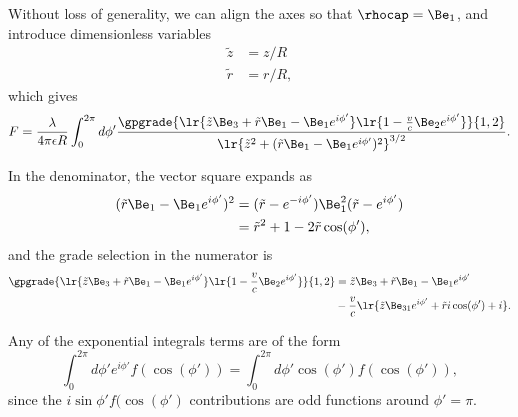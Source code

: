 Without loss of generality, we can align the axes so that \( \rhocap = \Be_1 \), and
introduce dimensionless variables
\begin{equation}\label{eqn:ringField:100}
\begin{aligned}
\tilde{z} &= z/R \\
\tilde{r} &= r/R,
\end{aligned}
\end{equation}
which gives
\begin{equation}\label{eqn:ringField:120}
F
= \frac{\lambda}{4 \pi \epsilon R} \int_0^{2\pi} d\phi' \frac{\gpgrade{ \lr{ \tilde{z} \Be_3 + \tilde{r} \Be_1 - \Be_1 e^{i\phi'} } \lr{ 1 - \frac{v}{c} \Be_2 e^{i\phi'} } }{1,2} } { \lr{ \tilde{z}^2 + (\tilde{r} \Be_1 - \Be_1 e^{i\phi'})^2}^{3/2} }.
\end{equation}

In the denominator, the vector square expands as
\begin{equation}\label{eqn:ringField:140}
\begin{aligned}
(\tilde{r} \Be_1 - \Be_1 e^{i\phi'})^2
&= (\tilde{r} - e^{-i\phi'}) \Be_1^2 (\tilde{r} - e^{i\phi'}) \\
&= \tilde{r}^2 + 1 - 2 \tilde{r} \cos(\phi'),
\end{aligned}
\end{equation}
and the grade selection in the numerator is
\begin{equation}\label{eqn:ringField:160}
\begin{aligned}
\gpgrade{ \lr{ \tilde{z} \Be_3 + \tilde{r} \Be_1 - \Be_1 e^{i\phi'} } \lr{ 1 - \frac{v}{c} \Be_2 e^{i\phi'}}}{1,2}
&=
\tilde{z} \Be_3 + \tilde{r} \Be_1 - \Be_1 e^{i\phi'} \\
&-\frac{v}{c}\lr{ \tilde{z} \Be_{31} e^{i\phi'} + \tilde{r} i \cos(\phi') + i }.
\end{aligned}
\end{equation}

Any of the exponential integrals terms
are of the form
\begin{equation}\label{eqn:ringField:180}
\int_0^{2\pi} d\phi' e^{i\phi'} f(\cos(\phi')) = \int_0^{2\pi} d\phi' \cos(\phi') f(\cos(\phi')),
\end{equation}
since the \( i \sin\phi' f(\cos(\phi') \) contributions are odd functions around \( \phi' = \pi \).

